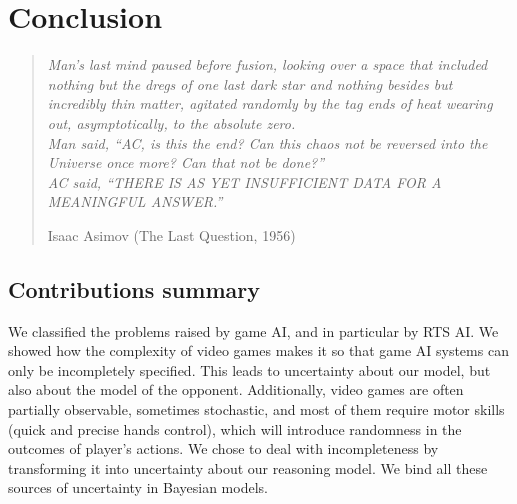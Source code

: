 \chapter{Conclusion}
\begin{quotation}\textit{
Man's last mind paused before fusion, looking over a space that included nothing but the dregs of one last dark star and nothing besides but incredibly thin matter, agitated randomly by the tag ends of heat wearing out, asymptotically, to the absolute zero.\\
Man said, ``AC, is this the end? Can this chaos not be reversed into the Universe once more? Can that not be done?''\\
AC said, ``THERE IS AS YET INSUFFICIENT DATA FOR A MEANINGFUL ANSWER.''
}
\begin{flushright}Isaac Asimov (The Last Question, 1956)\end{flushright}\end{quotation}


\section{Contributions summary}
We classified the problems raised by game AI, and in particular by RTS AI. We showed how the complexity of video games makes it so that game AI systems can only be incompletely specified. This leads to uncertainty about our model, but also about the model of the opponent. Additionally, video games are often partially observable, sometimes stochastic, and most of them require motor skills (quick and precise hands control), which will introduce randomness in the outcomes of player's actions. We chose to deal with incompleteness by transforming it into uncertainty about our reasoning model. We bind all these sources of uncertainty in Bayesian models. 

